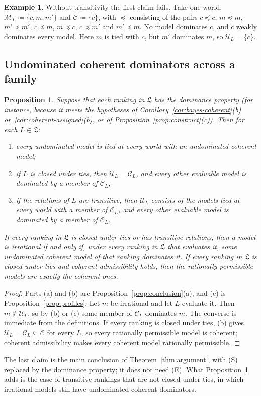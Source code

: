 \documentclass[11pt]{article}
\newtheorem{proposition}[theorem]{Proposition}
\theoremstyle{definition}
\newtheorem{example}[theorem]{Example}
\theoremstyle{remark}
\newcommand{\M}{\mathcal M}
\newcommand{\C}{\mathcal C}
\newcommand{\U}{\mathcal U}
\newcommand{\Lf}{\mathfrak L}
\begin{document}
\begin{example}\label{ex:intransitive}
Without transitivity the first claim fails. Take one world, $\M_L\coloneqq\{c,m,m'\}$ and $\C\coloneqq\{c\}$, with $\preceq$ consisting of the pairs $c\preceq c$, $m\preceq m$, $m'\preceq m'$, $c\preceq m$, $m\preceq c$, $c\preceq m'$ and $m'\preceq m$. No model dominates $c$, and $c$ weakly dominates every model. Here $m$ is tied with $c$, but $m'$ dominates $m$, so $\U_L=\{c\}$.
\end{example}

\subsection{Undominated coherent dominators across a family}
\begin{proposition}\label{prop:permissible}
Suppose that each ranking in $\Lf$ has the dominance property (for instance, because it meets the hypotheses of Corollary~\ref{cor:bayes-coherent}(b) or~\ref{cor:coherent-assigned}(b), or of Proposition~\ref{prop:construct}(c)). Then for each $L\in\Lf$:
\begin{enumerate}[label=(\alph*)]
\item every undominated model is tied at every world with an undominated coherent model;
\item if $L$ is closed under ties, then $\U_L=\C_L$, and every other evaluable model is dominated by a member of $\C_L$;
\item if the relations of $L$ are transitive, then $\U_L$ consists of the models tied at every world with a member of $\C_L$, and every other evaluable model is dominated by a member of $\C_L$.
\end{enumerate}
If every ranking in $\Lf$ is closed under ties or has transitive relations, then a model is irrational if and only if, under every ranking in $\Lf$ that evaluates it, some undominated coherent model of that ranking dominates it. If every ranking in $\Lf$ is closed under ties and coherent admissibility holds, then the rationally permissible models are exactly the coherent ones.
\end{proposition}
\begin{proof}
Parts (a) and (b) are Proposition~\ref{prop:conclusion}(a), and (c) is Proposition~\ref{prop:profiles}. Let $m$ be irrational and let $L$ evaluate it. Then $m\notin\U_L$, so by (b) or (c) some member of $\C_L$ dominates $m$. The converse is immediate from the definitions. If every ranking is closed under ties, (b) gives $\U_L=\C_L\subseteq\C$ for every $L$, so every rationally permissible model is coherent; coherent admissibility makes every coherent model rationally permissible.
\end{proof}
The last claim is the main conclusion of Theorem~\ref{thm:argument}, with (S) replaced by the dominance property; it does not need (E). What Proposition~\ref{prop:permissible} adds is the case of transitive rankings that are not closed under ties, in which irrational models still have undominated coherent dominators.
\end{document}
